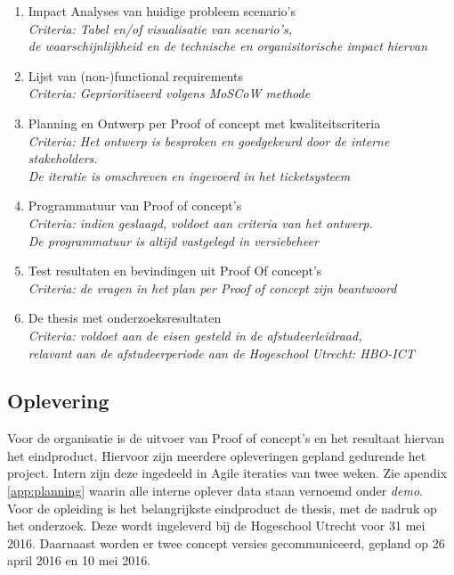\begin{enumerate}
\item Impact Analyses van huidige probleem scenario's \\
      \textit{Criteria: Tabel en/of visualisatie van scenario's, \\de waarschijnlijkheid en de technische en organisitorische impact hiervan }
\item Lijst van (non-)functional requirements \\
      \textit{Criteria: Geprioritiseerd volgens MoSCoW methode}
\item Planning en Ontwerp per Proof of concept met kwaliteitscriteria \\
      \textit{Criteria: Het ontwerp is besproken en goedgekeurd door de interne stakeholders.\\ De iteratie is omschreven en ingevoerd in het ticketsysteem}
\item Programmatuur van Proof of concept's \\
        \textit{Criteria: indien geslaagd, voldoet aan criteria van het ontwerp.\\ De programmatuur is altijd vastgelegd in versiebeheer}
\item Test resultaten en bevindingen uit Proof Of concept's \\
        \textit{Criteria: de vragen in het plan per Proof of concept zijn beantwoord}
\item De thesis met onderzoeksresultaten \\
    \textit{Criteria: voldoet aan de eisen gesteld in de afstudeerleidraad, \\
    relavant aan de afstudeerperiode aan de Hogeschool Utrecht: HBO-ICT}
\end{enumerate}

    \subsection{Oplevering}
    
    Voor de organisatie is de uitvoer van Proof of concept's en het resultaat hiervan het eindproduct. Hiervoor zijn meerdere opleveringen gepland gedurende het project. Intern zijn deze ingedeeld in Agile iteraties van twee weken. Zie apendix \ref{app:planning} waarin alle interne oplever data staan vernoemd onder \textit{demo}. \\
    
    Voor de opleiding is het belangrijkste eindproduct de thesis, met de nadruk op het onderzoek. Deze wordt ingeleverd bij de Hogeschool Utrecht voor 31 mei 2016. Daarnaast worden er twee concept versies gecommuniceerd, gepland op 26 april 2016 en 10 mei 2016.
    
